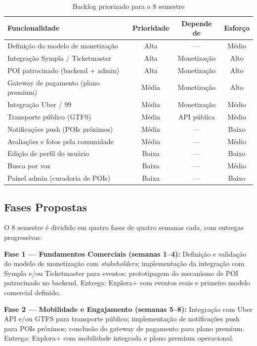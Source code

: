 \documentclass[12pt, a4paper]{article}
\begin{document}
\begin{table}[H]
\centering
\caption{Backlog priorizado para o 8\textordmasculine{} semestre}
\label{tab:backlog}
\begin{tabular}{p{5.5cm}ccc}
\toprule
\textbf{Funcionalidade} & \textbf{Prioridade} & \textbf{Depende de} & \textbf{Esfor\c{c}o} \\
\midrule
Defini\c{c}\~ao do modelo de monetiza\c{c}\~ao & Alta & --- & M\'edio \\
Integra\c{c}\~ao Sympla / Ticketmaster & Alta & Monetiza\c{c}\~ao & Alto \\
POI patrocinado (backend + admin) & Alta & Monetiza\c{c}\~ao & Alto \\
Gateway de pagamento (plano premium) & M\'edia & Monetiza\c{c}\~ao & Alto \\
Integra\c{c}\~ao Uber / 99 & M\'edia & Monetiza\c{c}\~ao & M\'edio \\
Transporte p\'ublico (GTFS) & M\'edia & API p\'ublica & M\'edio \\
Notifica\c{c}\~oes push (POIs pr\'oximos) & M\'edia & --- & Baixo \\
Avalia\c{c}\~oes e fotos pela comunidade & M\'edia & --- & M\'edio \\
Edi\c{c}\~ao de perfil do usu\'ario & Baixa & --- & Baixo \\
Busca por voz & Baixa & --- & M\'edio \\
Painel admin (curadoria de POIs) & Baixa & --- & Baixo \\
\bottomrule
\end{tabular}
\end{table}

\subsection{Fases Propostas}

O 8\textordmasculine{} semestre \'e dividido em quatro fases de quatro semanas cada, com entregas progressivas:

\textbf{Fase 1 --- Fundamentos Comerciais (semanas 1--4):} Defini\c{c}\~ao e valida\c{c}\~ao do modelo de monetiza\c{c}\~ao com \textit{stakeholders}; implementa\c{c}\~ao da integra\c{c}\~ao com Sympla e/ou Ticketmaster para eventos; prototipagem do mecanismo de POI patrocinado no backend. Entrega: Explora+ com eventos reais e primeiro modelo comercial definido.

\textbf{Fase 2 --- Mobilidade e Engajamento (semanas 5--8):} Integra\c{c}\~ao com Uber API e/ou GTFS para transporte p\'ublico; implementa\c{c}\~ao de notifica\c{c}\~oes push para POIs pr\'oximos; conclus\~ao do gateway de pagamento para plano premium. Entrega: Explora+ com mobilidade integrada e plano premium operacional.
\end{document}

